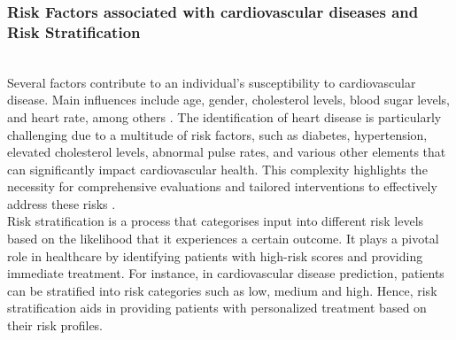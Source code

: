 \subsubsection{Risk Factors associated with cardiovascular diseases and Risk Stratification} \leavevmode
\\Several factors contribute to an individual's susceptibility to cardiovascular disease. Main influences include age, gender, cholesterol levels, blood sugar levels, and heart rate, among others \citep{garcia2023heart}. The identification of heart disease is particularly challenging due to a multitude of risk factors, such as diabetes, hypertension, elevated cholesterol levels, abnormal pulse rates, and various other elements that can significantly impact cardiovascular health. This complexity highlights the necessity for comprehensive evaluations and tailored interventions to effectively address these risks \citep{mohan2019effective}. \\
\noindent Risk stratification is a process that categorises input into different risk levels based on the likelihood that it experiences a certain outcome. It plays a pivotal role in healthcare by identifying patients with high-risk scores and providing immediate treatment. For instance, in cardiovascular disease prediction, patients can be stratified into risk categories such as low, medium and high. Hence, risk stratification aids in providing patients with personalized treatment based on their risk profiles. \vspace{0.4em}

